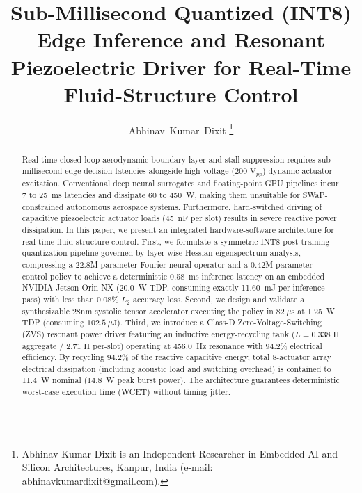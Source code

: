 \documentclass[journal,10pt,twocolumn]{IEEEtran}
\begin{document}
\title{Sub-Millisecond Quantized (INT8) Edge Inference and Resonant Piezoelectric Driver for Real-Time Fluid-Structure Control}

\author{Abhinav~Kumar~Dixit%
\thanks{Abhinav Kumar Dixit is an Independent Researcher in Embedded AI and Silicon Architectures, Kanpur, India (e-mail: abhinavkumardixit@gmail.com).}}


\maketitle

\begin{abstract}
Real-time closed-loop aerodynamic boundary layer and stall suppression requires sub-millisecond edge decision latencies alongside high-voltage ($200\text{ V}_{pp}$) dynamic actuator excitation. Conventional deep neural surrogates and floating-point GPU pipelines incur 7 to 25~ms latencies and dissipate 60 to 450~W, making them unsuitable for SWaP-constrained autonomous aerospace systems. Furthermore, hard-switched driving of capacitive piezoelectric actuator loads (45~nF per slot) results in severe reactive power dissipation. In this paper, we present an integrated hardware-software architecture for real-time fluid-structure control. First, we formulate a symmetric INT8 post-training quantization pipeline governed by layer-wise Hessian eigenspectrum analysis, compressing a 22.8M-parameter Fourier neural operator and a 0.42M-parameter control policy to achieve a deterministic 0.58~ms inference latency on an embedded NVIDIA Jetson Orin NX (20.0~W TDP, consuming exactly 11.60~mJ per inference pass) with less than 0.08\% $L_2$ accuracy loss. Second, we design and validate a synthesizable 28nm systolic tensor accelerator executing the policy in $82\ \mu\text{s}$ at 1.25~W TDP (consuming $102.5\ \mu\text{J}$). Third, we introduce a Class-D Zero-Voltage-Switching (ZVS) resonant power driver featuring an inductive energy-recycling tank ($L = 0.338\text{ H}$ aggregate / $2.71\text{ H}$ per-slot) operating at 456.0~Hz resonance with 94.2\% electrical efficiency. By recycling 94.2\% of the reactive capacitive energy, total 8-actuator array electrical dissipation (including acoustic load and switching overhead) is contained to 11.4~W nominal (14.8~W peak burst power). The architecture guarantees deterministic worst-case execution time (WCET) without timing jitter.
\end{abstract}
\end{document}
